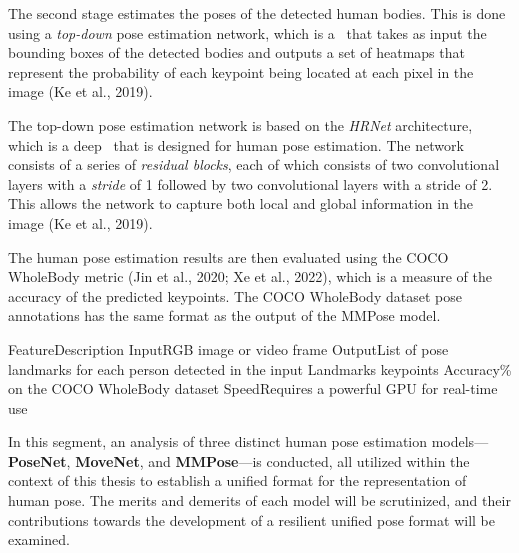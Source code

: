 The second stage estimates the poses of the detected human bodies. This is done using a {\em top-down} pose estimation network, which is a \CNN\ that takes as input the bounding boxes of the detected bodies and outputs a set of heatmaps that represent the probability of each keypoint being located at each pixel in the image (\scc Ke et al., 2019).

The top-down pose estimation network is based on the {\em HRNet} architecture, which is a deep \CNN\ that is designed for human pose estimation. The network consists of a series of {\em residual blocks}, each of which consists of two convolutional layers with a {\em stride} of 1 followed by two convolutional layers with a stride of 2. This allows the network to capture both local and global information in the image (\scc Ke et al., 2019).

The human pose estimation results are then evaluated using the COCO WholeBody metric (\scc Jin et al., 2020; \scc Xe et al., 2022), which is a measure of the accuracy of the predicted keypoints. The COCO WholeBody dataset pose annotations has the same format as the output of the MMPose model.

    \setupTABLE[r][1][style=bold]
    \setupTABLE[c][each][offset=3dd]
    \setupTABLE[frame=off]
    \setupTABLE[r][1][topframe=on,bottomframe=on]
    \setupTABLE[c][each][leftframe=on]
    \setupTABLE[c][1][leftframe=off]
    \bTR
        \bTD Feature\eTD\bTD    Description\eTD\eTR
    \bTR
        \bTD Input\eTD\bTD      RGB image or video frame\eTD\eTR
    \bTR
        \bTD Output\eTD\bTD     List of pose landmarks for each person detected in the input\eTD\eTR
    \bTR
        \bTD Landmarks\eTD{} keypoints\eTD\eTR
    \bTR
        \bTD Accuracy\eTD{}\% on the COCO WholeBody dataset\eTD\eTR
    \bTR
        \bTD Speed\eTD\bTD      Requires a powerful GPU for real-time use\eTD\eTR


In this segment, an analysis of three distinct human pose estimation models—{\bf PoseNet}, {\bf MoveNet}, and {\bf MMPose}—is conducted, all utilized within the context of this thesis to establish a unified format for the representation of human pose. The merits and demerits of each model will be scrutinized, and their contributions towards the development of a resilient unified pose format will be examined.

